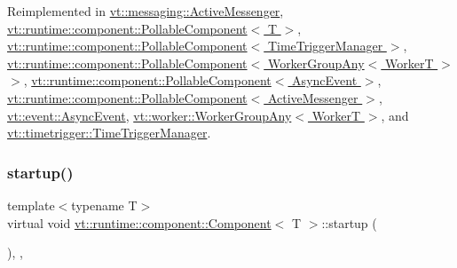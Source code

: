 Reimplemented in \hyperlink{structvt_1_1messaging_1_1_active_messenger_a4cd83c125e144ecbd9425fa7cd194538}{vt\+::messaging\+::\+Active\+Messenger}, \hyperlink{structvt_1_1runtime_1_1component_1_1_pollable_component_a34cad810026224d550cd9b0c9d1eff22}{vt\+::runtime\+::component\+::\+Pollable\+Component$<$ T $>$}, \hyperlink{structvt_1_1runtime_1_1component_1_1_pollable_component_a34cad810026224d550cd9b0c9d1eff22}{vt\+::runtime\+::component\+::\+Pollable\+Component$<$ Time\+Trigger\+Manager $>$}, \hyperlink{structvt_1_1runtime_1_1component_1_1_pollable_component_a34cad810026224d550cd9b0c9d1eff22}{vt\+::runtime\+::component\+::\+Pollable\+Component$<$ Worker\+Group\+Any$<$ Worker\+T $>$ $>$}, \hyperlink{structvt_1_1runtime_1_1component_1_1_pollable_component_a34cad810026224d550cd9b0c9d1eff22}{vt\+::runtime\+::component\+::\+Pollable\+Component$<$ Async\+Event $>$}, \hyperlink{structvt_1_1runtime_1_1component_1_1_pollable_component_a34cad810026224d550cd9b0c9d1eff22}{vt\+::runtime\+::component\+::\+Pollable\+Component$<$ Active\+Messenger $>$}, \hyperlink{structvt_1_1event_1_1_async_event_a36f18429bc2856a30c8f7fd70654e0a4}{vt\+::event\+::\+Async\+Event}, \hyperlink{structvt_1_1worker_1_1_worker_group_any_a1a2d6dc321514501e00c0373f2583146}{vt\+::worker\+::\+Worker\+Group\+Any$<$ Worker\+T $>$}, and \hyperlink{structvt_1_1timetrigger_1_1_time_trigger_manager_aa2d7955644dc9a1be6e813819b69f711}{vt\+::timetrigger\+::\+Time\+Trigger\+Manager}.

\mbox{\label{structvt_1_1runtime_1_1component_1_1_component_aad3974307ab3b2e1df389a91310f68c2}} 
\subsubsection{\texorpdfstring{startup()}{startup()}}
{\footnotesize\ttfamily template$<$typename T$>$ \\
virtual void \hyperlink{structvt_1_1runtime_1_1component_1_1_component}{vt\+::runtime\+::component\+::\+Component}$<$ T $>$\+::startup (\begin{DoxyParamCaption}{ }\end{DoxyParamCaption})\hspace{0.3cm}{\ttfamily [inline]}, {\ttfamily [override]}, {\ttfamily [virtual]}}



